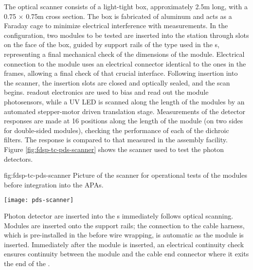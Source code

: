The optical scanner consists of a light-tight box, approximately \num{2.5}m long, with a \num{0.75} $\times$ \num{0.75}m cross section. 
The box is fabricated of aluminum and acts as a Faraday cage to minimize electrical interference with measurements. 
In the  configuration, two  modules to be tested are inserted into the station through slots on the face of the box, guided by support rails of the type used in the s, representing a final mechanical check of the dimensions of the module.  
Electrical connection to the module uses an electrical connector identical to the ones in the  frames, allowing a final check of that crucial interface.
Following insertion into the scanner, the insertion slots are closed and optically sealed, and the scan begins. 
  readout electronics are used to bias and read out the module photosensors, while a UV LED is scanned along the length of the modules by an automated stepper-motor driven translation stage.  
Measurements of the detector responses are made at 16 positions along the length of the module (on two sides for double-sided  modules), checking the performance of each of the dichroic  filters. 
The response is compared to that measured in the assembly facility. 
Figure \ref{fig:fdsp-tc-pds-scanner} shows the scanner used to test the  photon detectors.


\begin{dunefigure}{fig:fdsp-tc-pds-scanner}
{Picture of the scanner for operational tests of the  modules before integration into the APAs.} 

\texttt{[image: pds-scanner]}
\end{dunefigure}

Photon detector are inserted into the s immediately follows optical scanning.  
Modules are inserted onto the  support rails; the connection to the cable harness, which is pre-installed in the  before wire wrapping, is automatic as the module is inserted.   
Immediately after the module is inserted, an electrical continuity check ensures continuity between the  module and the  cable end connector where it exits the end of the .



